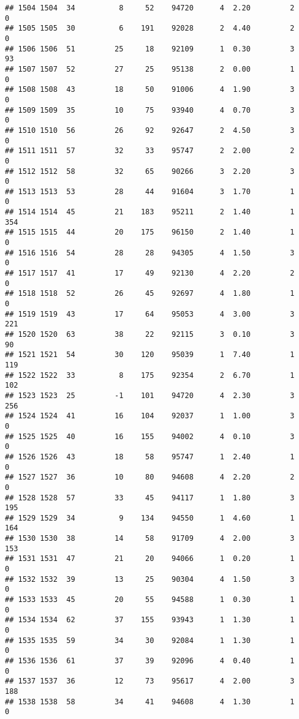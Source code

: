 \documentclass[
]{article}
\begin{document}
\begin{verbatim}
## 1504 1504  34          8     52    94720      4  2.20         2        0
## 1505 1505  30          6    191    92028      2  4.40         2        0
## 1506 1506  51         25     18    92109      1  0.30         3       93
## 1507 1507  52         27     25    95138      2  0.00         1        0
## 1508 1508  43         18     50    91006      4  1.90         3        0
## 1509 1509  35         10     75    93940      4  0.70         3        0
## 1510 1510  56         26     92    92647      2  4.50         3        0
## 1511 1511  57         32     33    95747      2  2.00         2        0
## 1512 1512  58         32     65    90266      3  2.20         3        0
## 1513 1513  53         28     44    91604      3  1.70         1        0
## 1514 1514  45         21    183    95211      2  1.40         1      354
## 1515 1515  44         20    175    96150      2  1.40         1        0
## 1516 1516  54         28     28    94305      4  1.50         3        0
## 1517 1517  41         17     49    92130      4  2.20         2        0
## 1518 1518  52         26     45    92697      4  1.80         1        0
## 1519 1519  43         17     64    95053      4  3.00         3      221
## 1520 1520  63         38     22    92115      3  0.10         3       90
## 1521 1521  54         30    120    95039      1  7.40         1      119
## 1522 1522  33          8    175    92354      2  6.70         1      102
## 1523 1523  25         -1    101    94720      4  2.30         3      256
## 1524 1524  41         16    104    92037      1  1.00         3        0
## 1525 1525  40         16    155    94002      4  0.10         3        0
## 1526 1526  43         18     58    95747      1  2.40         1        0
## 1527 1527  36         10     80    94608      4  2.20         2        0
## 1528 1528  57         33     45    94117      1  1.80         3      195
## 1529 1529  34          9    134    94550      1  4.60         1      164
## 1530 1530  38         14     58    91709      4  2.00         3      153
## 1531 1531  47         21     20    94066      1  0.20         1        0
## 1532 1532  39         13     25    90304      4  1.50         3        0
## 1533 1533  45         20     55    94588      1  0.30         1        0
## 1534 1534  62         37    155    93943      1  1.30         1        0
## 1535 1535  59         34     30    92084      1  1.30         1        0
## 1536 1536  61         37     39    92096      4  0.40         1        0
## 1537 1537  36         12     73    95617      4  2.00         3      188
## 1538 1538  58         34     41    94608      4  1.30         1        0

\end{verbatim}
\end{document}
